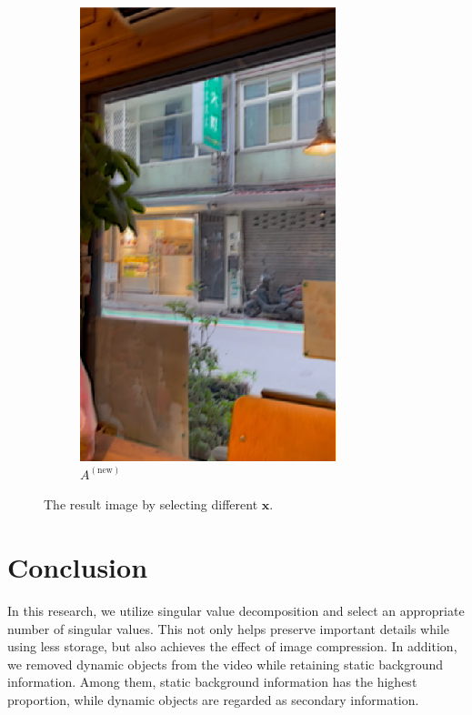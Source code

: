 \documentclass[12pt]{article}
\theoremstyle{definition}
\begin{document}
\begin{figure}[ht]
\begin{subfigure}[b]{0.3\textwidth}
         \includegraphics[width=\textwidth]{ch3_figures/video_after_3.png}
         \caption{$A^{(\text{new})}$}
         \label{fig:video_after_3}
     \end{subfigure}
     \caption{The result image by selecting different $\mathbf{x}$.}
     \label{fig:video_after}
\end{figure}

\section{Conclusion}
In this research, we utilize singular value decomposition and select an appropriate number of singular values. This not only helps preserve important details while using less storage, but also achieves the effect of image compression. In addition, we removed dynamic objects from the video while retaining static background information. Among them, static background information has the highest proportion, while dynamic objects are regarded as secondary information.
\end{document}
